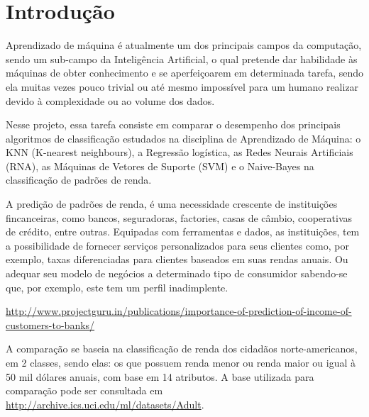 \section{Introdução}
Aprendizado de máquina é atualmente um dos principais campos da computação, sendo um sub-campo da Inteligência Artificial, o qual pretende dar habilidade às máquinas de obter conhecimento e se aperfeiçoarem em determinada tarefa, sendo ela muitas vezes pouco trivial ou até mesmo impossível para um humano realizar devido à complexidade ou ao volume dos dados.

Nesse projeto, essa tarefa consiste em comparar o desempenho dos principais algoritmos de classificação estudados na disciplina de Aprendizado de Máquina: o KNN (K-nearest neighbours), a Regressão logística, as Redes Neurais Artificiais (RNA), as Máquinas de Vetores de Suporte (SVM) e o Naive-Bayes na classificação de padrões de renda.

A predição de padrões de renda, é uma necessidade crescente de instituições fincanceiras, como bancos, seguradoras, factories, casas de câmbio, cooperativas de crédito, entre outras. Equipadas com ferramentas e dados, as instituições, tem a possibilidade de fornecer serviços personalizados para seus clientes como, por exemplo, taxas diferenciadas para clientes baseados em suas rendas anuais. Ou adequar seu modelo de negócios a determinado  tipo de consumidor sabendo-se que, por exemplo, este tem um perfil inadimplente.

\url{http://www.projectguru.in/publications/importance-of-prediction-of-income-of-customers-to-banks/}

A comparação se baseia na classificação de renda dos cidadãos norte-americanos, em 2 classes, sendo elas: os que possuem renda menor ou renda maior ou igual à 50 mil dólares anuais, com base em 14 atributos. A base utilizada para comparação pode ser consultada em \url{http://archive.ics.uci.edu/ml/datasets/Adult}. 